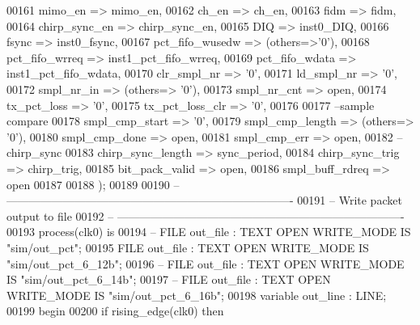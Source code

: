\begin{DoxyCode}
00161         mimo_en              => mimo_en,
00162         ch_en                    => ch_en,
00163         fidm                     => fidm,
00164         chirp_sync_en           => chirp_sync_en,
00165       DIQ                    => inst0_DIQ,
00166         fsync                   => inst0_fsync,
00167       pct_fifo_wusedw      => \textcolor{vhdlchar}{(}\textcolor{keywordflow}{others}=>'0'\textcolor{vhdlchar}{)},
00168       pct_fifo_wrreq       => inst1_pct_fifo_wrreq,
00169       pct_fifo_wdata       => inst1_pct_fifo_wdata,
00170       clr_smpl_nr          => '0',
00171       ld_smpl_nr           => '0',
00172       smpl_nr_in           => \textcolor{vhdlchar}{(}\textcolor{keywordflow}{others}=> '0'\textcolor{vhdlchar}{)},
00173       smpl_nr_cnt          => \textcolor{keywordflow}{open},
00174       tx_pct_loss          => '0',
00175       tx_pct_loss_clr      => '0',
00176         
00177 \textcolor{keyword}{        --sample compare}
00178       smpl_cmp_start       => '0',
00179       smpl_cmp_length      => \textcolor{vhdlchar}{(}\textcolor{keywordflow}{others}=> '0'\textcolor{vhdlchar}{)},
00180       smpl_cmp_done        => \textcolor{keywordflow}{open},
00181       smpl_cmp_err         => \textcolor{keywordflow}{open},
00182 \textcolor{keyword}{        --chirp\_sync}
00183         chirp_sync_length       => sync_period,
00184         chirp_sync_trig     => chirp_trig,
00185         bit_pack_valid          => \textcolor{keywordflow}{open},
00186         smpl_buff_rdreq     => \textcolor{keywordflow}{open}
00187      
00188         \textcolor{vhdlchar}{)};
00189         
00190 \textcolor{keyword}{ -- ----------------------------------------------------------------------------}
00191 \textcolor{keyword}{-- Write packet output to file}
00192 \textcolor{keyword}{-- ----------------------------------------------------------------------------       }
00193 \textcolor{keywordflow}{process}(clk0) \textcolor{keywordflow}{is}
00194 \textcolor{keyword}{   -- FILE out\_file  : TEXT OPEN WRITE\_MODE IS "sim/out\_pct";}
00195     \textcolor{keywordflow}{FILE} out\_file  : TEXT \textcolor{keywordflow}{OPEN} WRITE\_MODE \textcolor{keywordflow}{IS} \textcolor{keyword}{"sim/out\_pct\_6\_12b"};
00196 \textcolor{keyword}{   -- FILE out\_file  : TEXT OPEN WRITE\_MODE IS "sim/out\_pct\_6\_14b";}
00197 \textcolor{keyword}{   -- FILE out\_file  : TEXT OPEN WRITE\_MODE IS "sim/out\_pct\_6\_16b";}
00198    \textcolor{keywordflow}{variable} \textcolor{vhdlchar}{out\_line} \textcolor{vhdlchar}{:} \textcolor{vhdlchar}{LINE};
00199 \textcolor{vhdlkeyword}{begin}
00200    \textcolor{keywordflow}{if} \textcolor{vhdlchar}{rising\_edge}\textcolor{vhdlchar}{(}\textcolor{vhdlchar}{clk0}\textcolor{vhdlchar}{)} \textcolor{keywordflow}{then} 

\end{DoxyCode}
